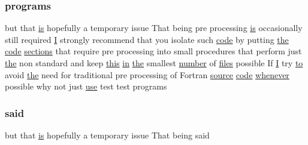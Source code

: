 \subsubsection{\texorpdfstring{programs}{programs}}
{\footnotesize\ttfamily but that \hyperlink{intro__blas1_83_8txt_a42a91df93f840595de3019ceb5d1df23}{is} hopefully a temporary issue That being pre processing \hyperlink{intro__blas1_83_8txt_a42a91df93f840595de3019ceb5d1df23}{is} occasionally still required \hyperlink{continue_87_8txt_ae7b8826453d28f1bdb2fba7e889eb23b}{I} strongly recommend that you isolate such \hyperlink{ufpp__overview_81_8txt_a74a0615f2d9c4a398d9126096f8092f8}{code} by putting \hyperlink{M__stopwatch_83_8txt_a0f266597de2e57eb3aa964927bb30e14}{the} \hyperlink{ufpp__overview_81_8txt_a74a0615f2d9c4a398d9126096f8092f8}{code} \hyperlink{intro__blas1_83_8txt_aa06cca0b542e18027a508f939187fc96}{sections} that require pre processing into small procedures that perform just \hyperlink{M__stopwatch_83_8txt_a0f266597de2e57eb3aa964927bb30e14}{the} non standard and keep \hyperlink{M__stopwatch_83_8txt_ad62a52042bb610eee5b36b5516caec22}{this} \hyperlink{M__journal_83_8txt_afce72651d1eed785a2132bee863b2f38}{in} \hyperlink{M__stopwatch_83_8txt_a0f266597de2e57eb3aa964927bb30e14}{the} smallest \hyperlink{what__overview_81_8txt_a5168680dcac08de182f59de9a12c38ae}{number} of \hyperlink{ufpp__overview_81_8txt_a5673f2294ff1627be40c90eae33141ca}{files} possible If \hyperlink{continue_87_8txt_ae7b8826453d28f1bdb2fba7e889eb23b}{I} try \hyperlink{M__stopwatch_83_8txt_a97209fd3e34ef701c0a9734280779cbb}{to} avoid \hyperlink{M__stopwatch_83_8txt_a0f266597de2e57eb3aa964927bb30e14}{the} need for traditional pre processing of Fortran \hyperlink{ufpp__overview_81_8txt_a4d6669ece605d05985c83a04dd38e0ad}{source} \hyperlink{ufpp__overview_81_8txt_a74a0615f2d9c4a398d9126096f8092f8}{code} \hyperlink{do_87_8txt_a810fd937840b16353708346232656a5f}{whenever} possible why not just \hyperlink{intro__blas1_83_8txt_a04fa2694d85f67a675bb3f45f7241f48}{use} test test programs}

\mbox{\label{ufpp__overview_81_8txt_a7f6c233b45fc747402eec6ec7e1e89fc}} 
\subsubsection{\texorpdfstring{said}{said}}
{\footnotesize\ttfamily but that \hyperlink{intro__blas1_83_8txt_a42a91df93f840595de3019ceb5d1df23}{is} hopefully a temporary issue That being said}

